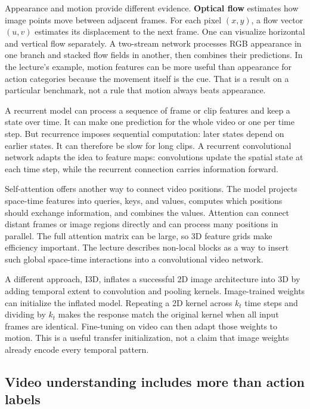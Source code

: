 \hypertarget{04-visual-computing-ii-ch031-motion-streams-recurrent-models-and-attention}{}

Appearance and motion provide different evidence. \textbf{Optical flow} estimates how image points move between adjacent frames. For each pixel \((x,y)\), a flow vector \((u,v)\) estimates its displacement to the next frame. One can visualize horizontal and vertical flow separately. A two-stream network processes RGB appearance in one branch and stacked flow fields in another, then combines their predictions. In the lecture's example, motion features can be more useful than appearance for action categories because the movement itself is the cue. That is a result on a particular benchmark, not a rule that motion always beats appearance.

A recurrent model can process a sequence of frame or clip features and keep a state over time. It can make one prediction for the whole video or one per time step. But recurrence imposes sequential computation: later states depend on earlier states. It can therefore be slow for long clips. A recurrent convolutional network adapts the idea to feature maps: convolutions update the spatial state at each time step, while the recurrent connection carries information forward.

Self-attention offers another way to connect video positions. The model projects space-time features into queries, keys, and values, computes which positions should exchange information, and combines the values. Attention can connect distant frames or image regions directly and can process many positions in parallel. The full attention matrix can be large, so 3D feature grids make efficiency important. The lecture describes non-local blocks as a way to insert such global space-time interactions into a convolutional video network.

A different approach, I3D, inflates a successful 2D image architecture into 3D by adding temporal extent to convolution and pooling kernels. Image-trained weights can initialize the inflated model. Repeating a 2D kernel across \(k_t\) time steps and dividing by \(k_t\) makes the response match the original kernel when all input frames are identical. Fine-tuning on video can then adapt those weights to motion. This is a useful transfer initialization, not a claim that image weights already encode every temporal pattern.

\subsection{Video understanding includes more than action labels}\label{04-visual-computing-ii-ch031-video-understanding-includes-more-than-action-labels}

